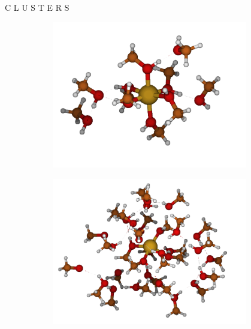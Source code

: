 \documentclass[final]{beamer}
\newlength{\sepwidth}
\newlength{\colwidth}
\newcommand{\separatorcolumn}{\begin{column}{\sepwidth}\end{column}}
\begin{document}
\begin{frame}[t]
\begin{columns}[t]
		\separatorcolumn

		\begin{column}{\colwidth}

			\begin{alertblock}{C L U S T E R S}

				\begin{figure}[H]
					\centering
					\begin{subfigure}[b]{0.27\textwidth}
						\centering
						\includegraphics[width=\textwidth]{logos/Cu-10CH4O.png}
						\caption{\ce{[Cu(CH3OH)_{10}]^{2+}}}
						\label{fig:cu-10ch4o}
					\end{subfigure}%
					\hfill
					\begin{subfigure}[b]{0.27\textwidth}
						\centering
						\includegraphics[width=\textwidth]{logos/Cu-30CH4O.png}

\end{subfigure}
\end{figure}
\end{alertblock}
\end{column}
\end{columns}
\end{frame}
\end{document}
